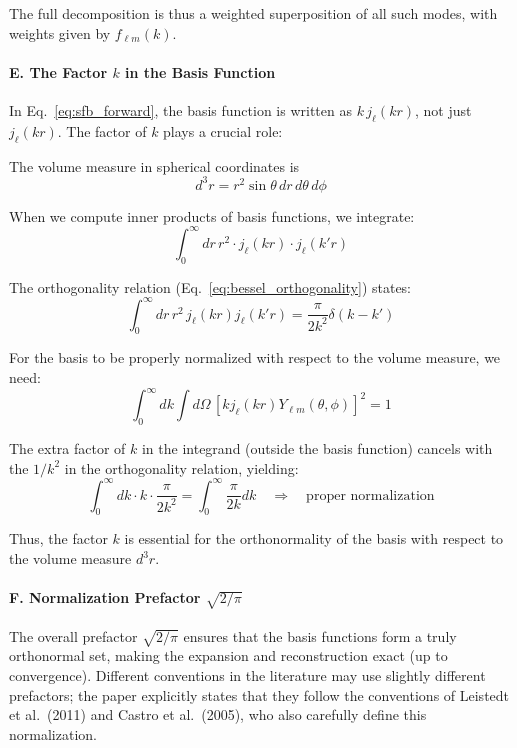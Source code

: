 The full decomposition is thus a weighted superposition of all such modes, with weights given by $f_{\ell m}(k)$.

\paragraph{E. The Factor $k$ in the Basis Function}

In Eq.~\eqref{eq:sfb_forward}, the basis function is written as $k \, j_\ell(kr)$, not just $j_\ell(kr)$. The factor of $k$ plays a crucial role:

The volume measure in spherical coordinates is
\begin{equation}
d^3r = r^2 \sin\theta \, dr \, d\theta \, d\phi
\end{equation}

When we compute inner products of basis functions, we integrate:
\begin{equation}
\int_0^\infty dr \, r^2 \cdot j_\ell(kr) \cdot j_\ell(k'r)
\end{equation}

The orthogonality relation (Eq.~\eqref{eq:bessel_orthogonality}) states:
\begin{equation}
\int_0^\infty dr \, r^2 \, j_\ell(kr) j_\ell(k'r) = \frac{\pi}{2k^2} \delta(k - k')
\end{equation}

For the basis to be properly normalized with respect to the volume measure, we need:
\begin{equation}
\int_0^\infty dk \int d\Omega \, \left[ k j_\ell(kr) Y_{\ell m}(\theta, \phi) \right]^2 = 1
\end{equation}

The extra factor of $k$ in the integrand (outside the basis function) cancels with the $1/k^2$ in the orthogonality relation, yielding:
\begin{equation}
\int_0^\infty dk \cdot k \cdot \frac{\pi}{2k^2} = \int_0^\infty \frac{\pi}{2k} dk \quad \Rightarrow \quad \text{proper normalization}
\end{equation}

Thus, the factor $k$ is essential for the orthonormality of the basis with respect to the volume measure $d^3r$.

\paragraph{F. Normalization Prefactor $\sqrt{2/\pi}$}

The overall prefactor $\sqrt{2/\pi}$ ensures that the basis functions form a truly orthonormal set, making the expansion and reconstruction exact (up to convergence). Different conventions in the literature may use slightly different prefactors; the paper explicitly states that they follow the conventions of Leistedt et al.\ (2011) and Castro et al.\ (2005), who also carefully define this normalization.

